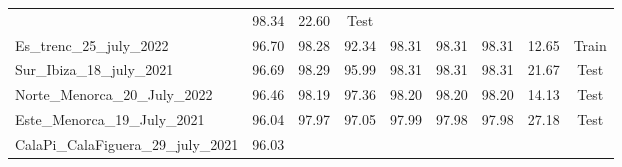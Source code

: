 \begin{table}[H]
{\begin{tabular}{lcccccccc}
                                                   & 98.34
                                                   & 22.60
                                                   & {\color[HTML]{fc8d62}
                    Test}
            \\
            Es\_trenc\_25\_july\_2022              & 96.70
                                                   & 98.28
                                                   & 92.34
                                                   & 98.31
                                                   & 98.31
                                                   & 98.31
                                                   & 12.65
                                                   & {\color[HTML]{66c2a5}
                    Train}
            \\
            Sur\_Ibiza\_18\_july\_2021             & 96.69
                                                   & 98.29
                                                   & 95.99
                                                   & 98.31
                                                   & 98.31
                                                   & 98.31
                                                   & 21.67
                                                   & {\color[HTML]{fc8d62}
                    Test}
            \\
            Norte\_Menorca\_20\_July\_2022         & 96.46
                                                   & 98.19
                                                   & 97.36
                                                   & 98.20
                                                   & 98.20
                                                   & 98.20
                                                   & 14.13
                                                   & {\color[HTML]{fc8d62}
                    Test}
            \\
            Este\_Menorca\_19\_July\_2021          & 96.04
                                                   & 97.97
                                                   & 97.05
                                                   & 97.99
                                                   & 97.98
                                                   & 97.98
                                                   & 27.18
                                                   & {\color[HTML]{fc8d62}
                    Test}
            \\
            CalaPi\_CalaFiguera\_29\_july\_2021    & 96.03

\end{tabular}}
\end{table}
